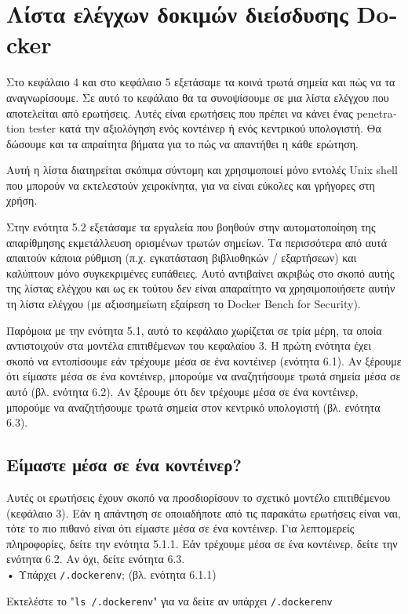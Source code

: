 \chapter{Λίστα ελέγχων δοκιμών διείσδυσης \textlatin{Docker}}
\label{dockerPenTestChecklist}

Στο κεφάλαιο 4 και στο κεφάλαιο 5 εξετάσαμε τα κοινά τρωτά σημεία και πώς
να τα αναγνωρίσουμε. Σε αυτό το κεφάλαιο θα τα συνοψίσουμε σε μια λίστα ελέγχου
που αποτελείται από ερωτήσεις. Αυτές είναι ερωτήσεις που πρέπει να κάνει ένας
\textlatin{penetration tester} κατά την αξιολόγηση ενός κοντέινερ ή ενός
κεντρικού υπολογιστή. Θα δώσουμε και τα απραίτητα βήματα για το πώς να απαντήθει
η κάθε ερώτηση.

Αυτή η λίστα διατηρείται σκόπιμα σύντομη και χρησιμοποιεί μόνο εντολές
\textlatin{Unix shell} που μπορούν να εκτελεστούν χειροκίνητα, για να είναι
εύκολες και γρήγορες στη χρήση.

Στην ενότητα 5.2 εξετάσαμε τα εργαλεία που βοηθούν στην αυτοματοποίηση της
απαρίθμησης εκμετάλλευση ορισμένων τρωτών σημείων. Τα περισσότερα από αυτά
απαιτούν κάποια ρύθμιση (π.χ. εγκατάσταση βιβλιοθηκών / εξαρτήσεων) και
καλύπτουν μόνο συγκεκριμένες ευπάθειες. Αυτό αντιβαίνει ακριβώς στο σκοπό αυτής
της λίστας ελέγχου και ως εκ τούτου δεν είναι απαραίτητο να χρησιμοποιήσετε
αυτήν τη λίστα ελέγχου (με αξιοσημείωτη εξαίρεση το
\textlatin{Docker Bench for Security}).

Παρόμοια με την ενότητα 5.1, αυτό το κεφάλαιο χωρίζεται σε τρία μέρη, τα οποία
αντιστοιχούν στα μοντέλα επιτιθέμενων του κεφαλαίου 3. Η πρώτη ενότητα έχει
σκοπό να εντοπίσουμε εάν τρέχουμε μέσα σε ένα κοντέινερ (ενότητα 6.1). Αν
ξέρουμε ότι είμαστε μέσα σε ένα κοντέινερ, μπορούμε να αναζητήσουμε τρωτά σημεία
μέσα σε αυτό (βλ. ενότητα 6.2). Αν ξέρουμε ότι δεν τρέχουμε μέσα σε ένα
κοντέινερ, μπορούμε να αναζητήσουμε τρωτά σημεία στον κεντρικό υπολογιστή (βλ.
ενότητα 6.3).

\section{Είμαστε μέσα σε ένα κοντέινερ?}

Αυτές οι ερωτήσεις έχουν σκοπό να προσδιορίσουν το σχετικό μοντέλο επιτιθέμενου
(κεφάλαιο 3). Εάν η απάντηση σε οποιαδήποτε από τις παρακάτω ερωτήσεις είναι
ναι, τότε το πιο πιθανό είναι ότι είμαστε μέσα σε ένα κοντέινερ. Για λεπτομερείς
πληροφορίες, δείτε την ενότητα 5.1.1. Εάν τρέχουμε μέσα σε ένα κοντέινερ, δείτε
την ενότητα 6.2. Αν όχι, δείτε ενότητα 6.3. \\

• Υπάρχει \texttt{\textlatin{/.dockerenv}}; (βλ. ενότητα 6.1.1)

Εκτελέστε το "\texttt{\textlatin{ls /.dockerenv}}" για να δείτε αν υπάρχει
\texttt{\textlatin{/.dockerenv}}
